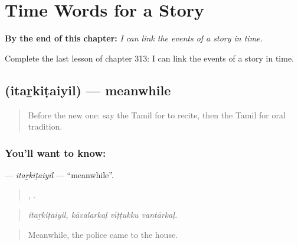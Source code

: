 
\chapter{Time Words for a Story}
\label{ch:ta-time-words-for-a-story}

\begin{chapteropening}
\textbf{By the end of this chapter:} \emph{I can link the events of a story in time.}

Complete the last lesson of chapter 313: I can link the events of a story in time.
\end{chapteropening}

\section[\texorpdfstring{\ta{இதற்கிடையில்} (itaṟkiṭaiyil)}{இதற்கிடையில் (itaṟkiṭaiyil)}]{ (itaṟkiṭaiyil) — meanwhile}

\label{lesson:TA-C313-itarkitaiyil}



\begin{quote}
Before the new one: say the Tamil for to recite, then the Tamil for oral tradition.
\end{quote}

\subsection*{You'll want to know: }
\textbf{} — \emph{itaṟkiṭaiyil} — \textquotedblleft{}meanwhile\textquotedblright{}.

\begin{quote}
,   .
\end{quote}

\begin{quote}
\emph{itaṟkiṭaiyil, kāvalarkaḷ vīṭṭukku vantārkaḷ.}
\end{quote}

\begin{quote}
Meanwhile, the police came to the house.
\end{quote}

